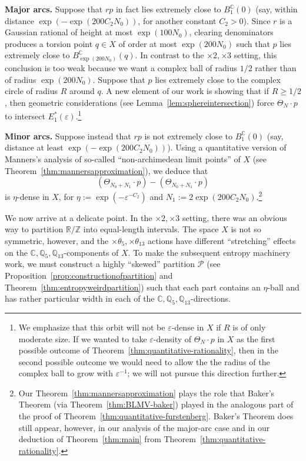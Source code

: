 \documentclass[11pt]{amsart}
\theoremstyle{definition}
\newcommand{\C}{{\mathbb C}}
\begin{document}
{\bf Major arcs.}  Suppose that $rp$ in fact lies extremely close to $B^{\C}_1(0)$ (say, within distance $\exp(-\exp(200C_2 N_0))$, for another constant $C_2>0$).  Since $r$ is a Gaussian rational of height at most $\exp(100N_0)$, clearing denominators produces a torsion point $q \in X$ of order at most $\exp(200N_0)$ such that $p$ lies extremely close to $B^{\C}_{\exp(200N_0)}(q)$.  In contrast to the $\times 2, \times 3$ setting, this conclusion is too weak because we want a complex ball of radius $1/2$ rather than of radius $\exp(200N_0)$.  Suppose that $p$ lies extremely close to the complex circle of radius $R$ around $q$.  A new element of our work is showing that if $R\geq 1/2$, then geometric considerations (see Lemma~\ref{lem:sphereintersection}) force $\Theta_N \cdot p$ to intersect $E_1^*(\varepsilon)$.\footnote{We emphasize that this orbit will not be $\varepsilon$-dense in $X$ if $R$ is of only moderate size.  If we wanted to take $\varepsilon$-density of $\Theta_N \cdot p$ in $X$ as the first possible outcome of Theorem~\ref{thm:quantitative-rationality}, then in the second possible outcome we would need to allow the the radius of the complex ball to grow with $\varepsilon^{-1}$; we will not pursue this direction further.}

{\bf Minor arcs.} Suppose instead that $rp$ is not extremely close to $B^{\C}_1(0)$ (say, distance at least $\exp(-\exp(200C_2 N_0))$).  Using a quantitative version of Manners's analysis of so-called ``non-archimedean limit points'' of $X$ (see Theorem~\ref{thm:mannersapproximation}), we deduce that
$$(\Theta_{N_0+N_1} \cdot p)-(\Theta_{N_0+N_1} \cdot p)$$
is $\eta$-dense in $X$, for $\eta:=\exp(-\varepsilon^{-C_2})$ and $N_1:=2\exp(200C_2 N_0)$.\footnote{Our Theorem~\ref{thm:mannersapproximation} plays the role that Baker's Theorem (via Theorem~\ref{thm:BLMV-baker}) played in the analogous part of the proof of Theorem~\ref{thm:quantitative-furstenberg}.  Baker's Theorem does still appear, however, in our analysis of the major-arc case and in our deduction of Theorem~\ref{thm:main} from Theorem~\ref{thm:quantitative-rationality}.}

We now arrive at a delicate point.  In the $\times 2, \times 3$ setting, there was an obvious way to partition $\mathbb{R}/\mathbb{Z}$ into equal-length intervals.  The space $X$ is not so symmetric, however, and the $\times \theta_5, \times \theta_{13}$ actions have different ``stretching'' effects on the $\mathbb{C}, \mathbb{Q}_5, \mathbb{Q}_{13}$-components of $X$.  To make the subsequent entropy machinery work, we must construct a highly ``skewed'' partition $\mathcal{P}$ (see Proposition~\ref{prop:constructionofpartition} and Theorem~\ref{thm:entropyweirdpartition}) such that each part contains an $\eta$-ball and has rather particular width in each of the $\mathbb{C}, \mathbb{Q}_5, \mathbb{Q}_{13}$-directions.
\end{document}
